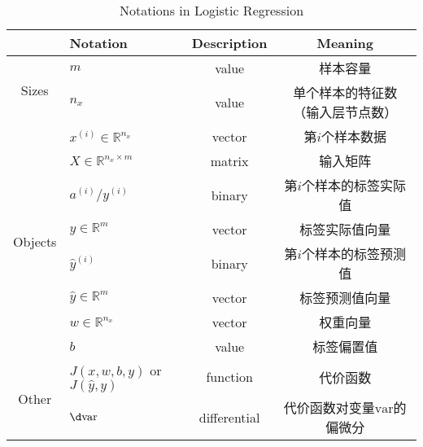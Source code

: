 \begin{table}[htb!]
    \centering
    \begin{threeparttable}
    \caption{Notations in Logistic Regression}
    \begin{tabular}{clcc}
        \toprule
                                    & \textbf{Notation}                         & \textbf{Description} & \textbf{Meaning}                                                   \\ \midrule
        \multirow{2}{*}{Sizes}      & $m$                                       & value                & 样本容量                                                               \\
                                    & $n_x$                                     & value                & 单个样本的特征数（输入层节点数）                                         \\ \midrule
        \multirow{8}{*}{Objects}    & $x^{(i)} \in \mathbb{R}^{n_x}$            & vector               & 第$i$个样本数据                                                          \\
                                    & $X \in {\mathbb{R}^{n_x \times m}}$       & matrix               & 输入矩阵                                                               \\
                                    & $a^{(i)} / y^{(i)}$                       & binary               & 第$i$个样本的标签实际值                                                        \\
                                    & $y \in \mathbb{R}^{m}$					& vector               & 标签实际值向量                                                          \\
                                    & $\hat{y}^{(i)}$                           & binary               & 第$i$个样本的标签预测值                                                  \\
                                    & $\hat{y} \in {\mathbb{R}^{m}}$            & vector               & 标签预测值向量   					                                     \\
                                    & $w \in \mathbb{R}^{n_x}$                  & vector               & 权重向量                                                                \\
                                    & $b$                                       & value                & 标签偏置值                                                            \\ \midrule
        \multirow{2}{*}{Other}      & $J(x,w,b,y)$ or $J(\hat{y},y)$            & function             & 代价函数                                                               \\
                                    & $\d \mathrm{var}$                  & differential         & 代价函数对变量$\mathrm{var}$的偏微分                                    \\ 
        \bottomrule
    \end{tabular}
    \label{tab:notations_LR}
    \end{threeparttable}
\end{table}

